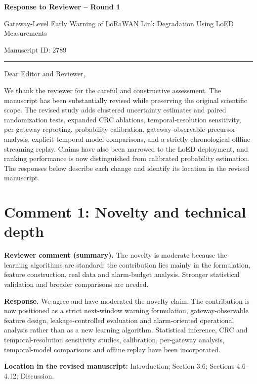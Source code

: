 \documentclass[11pt]{article}
\newcommand{\ReviewerComment}[1]{\par\noindent\textcolor{reviewblue}{\textbf{Reviewer comment (summary).}} #1\par}
\newcommand{\AuthorResponse}[1]{\par\noindent\textcolor{responsegreen}{\textbf{Response.}} #1\par}
\newcommand{\Location}[1]{\par\noindent\textbf{Location in the revised manuscript:} #1\par}
\begin{document}
\begin{center}
{\Large\bfseries Response to Reviewer -- Round 1}\par
\vspace{6pt}
{\large Gateway-Level Early Warning of LoRaWAN Link Degradation Using LoED Measurements}\par
\vspace{4pt}
Manuscript ID: 2789
\end{center}

\hrule
\vspace{10pt}

Dear Editor and Reviewer,

We thank the reviewer for the careful and constructive assessment. The manuscript has been substantially revised while preserving the original scientific scope. The revised study adds clustered uncertainty estimates and paired randomization tests, expanded CRC ablations, temporal-resolution sensitivity, per-gateway reporting, probability calibration, gateway-observable precursor analysis, explicit temporal-model comparisons, and a strictly chronological offline streaming replay. Claims have also been narrowed to the LoED deployment, and ranking performance is now distinguished from calibrated probability estimation. The responses below describe each change and identify its location in the revised manuscript.

\section*{Comment 1: Novelty and technical depth}
\ReviewerComment{The novelty is moderate because the learning algorithms are standard; the contribution lies mainly in the formulation, feature construction, real data and alarm-budget analysis. Stronger statistical validation and broader comparisons are needed.}
\AuthorResponse{We agree and have moderated the novelty claim. The contribution is now positioned as a strict next-window warning formulation, gateway-observable feature design, leakage-controlled evaluation and alarm-oriented operational analysis rather than as a new learning algorithm. Statistical inference, CRC and temporal-resolution sensitivity studies, calibration, per-gateway analysis, temporal-model comparisons and offline replay have been incorporated.}
\Location{Introduction; Section 3.6; Sections 4.6--4.12; Discussion.}
\end{document}
